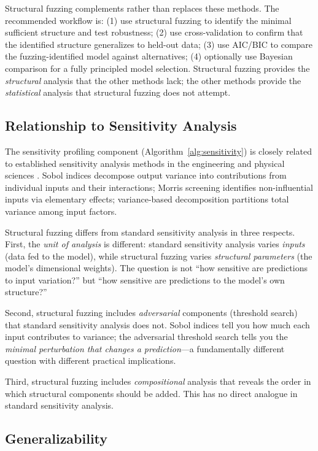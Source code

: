 \documentclass[12pt]{article}
\begin{document}
Structural fuzzing complements rather than replaces these methods.  The recommended workflow is: (1) use structural fuzzing to identify the minimal sufficient structure and test robustness; (2) use cross-validation to confirm that the identified structure generalizes to held-out data; (3) use AIC/BIC to compare the fuzzing-identified model against alternatives; (4) optionally use Bayesian comparison for a fully principled model selection.  Structural fuzzing provides the \emph{structural} analysis that the other methods lack; the other methods provide the \emph{statistical} analysis that structural fuzzing does not attempt.

\subsection{Relationship to Sensitivity Analysis}

The sensitivity profiling component (Algorithm~\ref{alg:sensitivity}) is closely related to established sensitivity analysis methods in the engineering and physical sciences \cite{saltelli2008}.  Sobol indices decompose output variance into contributions from individual inputs and their interactions; Morris screening identifies non-influential inputs via elementary effects; variance-based decomposition partitions total variance among input factors.

Structural fuzzing differs from standard sensitivity analysis in three respects.  First, the \emph{unit of analysis} is different: standard sensitivity analysis varies \emph{inputs} (data fed to the model), while structural fuzzing varies \emph{structural parameters} (the model's dimensional weights).  The question is not ``how sensitive are predictions to input variation?'' but ``how sensitive are predictions to the model's own structure?''

Second, structural fuzzing includes \emph{adversarial} components (threshold search) that standard sensitivity analysis does not.  Sobol indices tell you how much each input contributes to variance; the adversarial threshold search tells you the \emph{minimal perturbation that changes a prediction}---a fundamentally different question with different practical implications.

Third, structural fuzzing includes \emph{compositional} analysis that reveals the order in which structural components should be added.  This has no direct analogue in standard sensitivity analysis.

\subsection{Generalizability}
\end{document}
